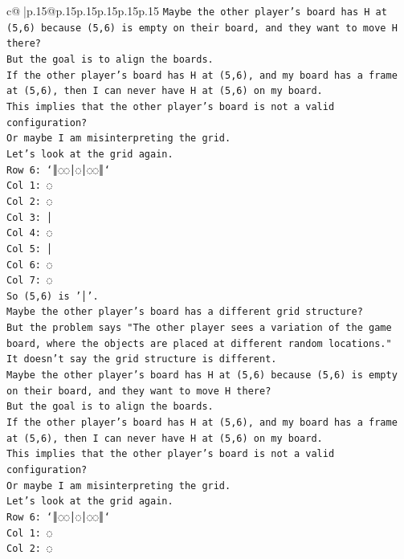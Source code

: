 \documentclass{article}
\begin{document}
{\begin{supertabular}{c@{$\;$}|p{.15\linewidth}@{}p{.15\linewidth}p{.15\linewidth}p{.15\linewidth}p{.15\linewidth}p{.15\linewidth}}
{{{\texttt{Maybe the other player's board has H at (5,6) because (5,6) is empty on their board, and they want to move H there?} \\
\texttt{But the goal is to align the boards.} \\
\texttt{If the other player's board has H at (5,6), and my board has a frame at (5,6), then I can never have H at (5,6) on my board.} \\
\texttt{This implies that the other player's board is not a valid configuration?} \\
\texttt{Or maybe I am misinterpreting the grid.} \\
\texttt{Let's look at the grid again.} \\
\texttt{Row 6: `║◌◌│◌│◌◌║`} \\
\texttt{Col 1: ◌} \\
\texttt{Col 2: ◌} \\
\texttt{Col 3: │} \\
\texttt{Col 4: ◌} \\
\texttt{Col 5: │} \\
\texttt{Col 6: ◌} \\
\texttt{Col 7: ◌} \\
\texttt{So (5,6) is '│'.} \\
\texttt{Maybe the other player's board has a different grid structure?} \\
\texttt{But the problem says "The other player sees a variation of the game board, where the objects are placed at different random locations."} \\
\texttt{It doesn't say the grid structure is different.} \\
\texttt{Maybe the other player's board has H at (5,6) because (5,6) is empty on their board, and they want to move H there?} \\
\texttt{But the goal is to align the boards.} \\
\texttt{If the other player's board has H at (5,6), and my board has a frame at (5,6), then I can never have H at (5,6) on my board.} \\
\texttt{This implies that the other player's board is not a valid configuration?} \\
\texttt{Or maybe I am misinterpreting the grid.} \\
\texttt{Let's look at the grid again.} \\
\texttt{Row 6: `║◌◌│◌│◌◌║`} \\
\texttt{Col 1: ◌} \\
\texttt{Col 2: ◌} \\
}}}
\end{supertabular}}
\end{document}
